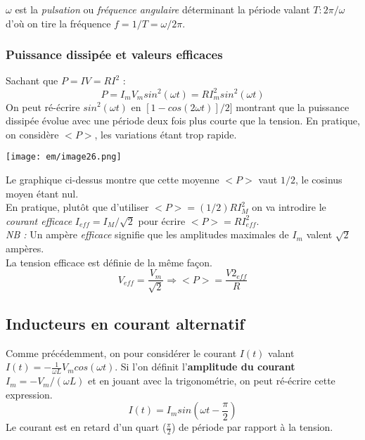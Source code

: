 \documentclass[british,french,11pt, a4paper, openany]{book}
\begin{document}
$\omega$ est la \textit{pulsation} ou \textit{fréquence angulaire} déterminant la période valant $T : 2\pi /\omega$ d'où on tire la fréquence $f = 1/T = \omega / 2\pi$.

\subsubsection{Puissance dissipée et valeurs efficaces}
Sachant que $P = IV = RI^2$ :
\begin{equation}
	P = I_mV_m sin^2(\omega t) = RI_m^2 sin^2(\omega t)
\end{equation}
On peut ré-écrire $sin^2(\omega t)$ en $[1-cos(2\omega t)]/2]$ montrant que la puissance dissipée évolue avec une période deux fois plus courte que la tension. En pratique, on considère $<P>$, les variations étant trop rapide.
	\begin{center}
		\texttt{[image: em/image26.png]}\\
	\end{center}
	Le graphique ci-dessus montre que cette moyenne $<P>$ vaut $1/2$, le cosinus moyen étant nul.\\
	En pratique, plutôt que d'utiliser $<P> = (1/2)RI^2_M$  on va introdire le \textit{courant efficace} $I_{eff} = I_M/\sqrt{2}$ pour écrire $<P> = RI_{eff}^2$.\\
	
	\textit{NB :} Un ampère \textit{efficace} signifie que les amplitudes maximales de $I_m$ valent $\sqrt{2}$ ampères.\\
	La tension efficace est définie de la même façon.
	\begin{equation}
		V_{eff} = \frac{V_m}{\sqrt{2}} \Rightarrow <P> = \frac{V2_{eff}}{R}
	\end{equation}
	
	\subsection{Inducteurs en courant alternatif}
	Comme précédemment, on pour considérer le courant  $I(t)$ valant $I(t) = -\frac{1}{\omega L}V_m cos(\omega t)$. Si l'on définit l'\textbf{amplitude du courant} $I_m = -V_m/(\omega L)$ et en jouant avec la trigonométrie, on peut ré-écrire cette expression.
	\begin{equation}
		I(t) = I_m sin(\omega t - \frac{\pi}{2})
	\end{equation}
	Le courant est en retard d'un quart ($\frac{\pi}{2}$) de période  par rapport à la tension.
\end{document}
